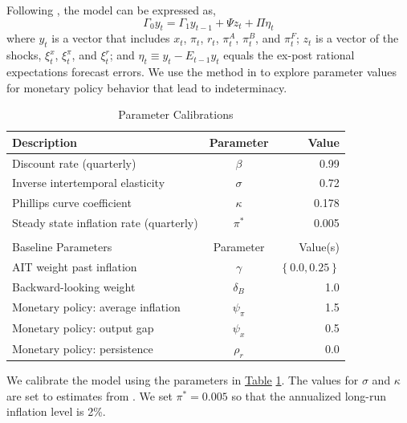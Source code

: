 \documentclass[english,authoryear,12pt]{elsarticle}
\begin{document}
Following \citet{sims2002}, the model can be expressed as,
\begin{equation}
	\Gamma_0 y_t = \Gamma_1 y_{t-1} + \Psi z_t + \Pi \eta_t
\end{equation}
where $y_t$ is a vector that includes $x_t$, $\pi_t$, $r_t$, $\pi_t^A$, $\pi_t^B$, and $\pi_t^F$; $z_t$ is a vector of the shocks, $\xi_t^x$, $\xi_t^\pi$, and $\xi_t^r$; and $\eta_t \equiv y_t - E_{t-1} y_t$ equals the ex-post rational expectations forecast errors. We use the method in \citet{sims2002} to explore parameter values for monetary policy behavior that lead to indeterminacy.

\begin{table}[htp]
	\captionsetup{justification=centering}
	\caption{Parameter Calibrations}\label{tb:parms}
	\begin{center}
		\vspace*{-1pc}\begin{tabular}{lcr}
			Description & Parameter & Value \\ \hline
			Discount rate (quarterly) & $\beta$ & 0.99 \\
			Inverse intertemporal elasticity & $\sigma$ & 0.72 \\
			Phillips curve coefficient & $\kappa$ & 0.178 \\
			Steady state inflation rate (quarterly) & $\pi^*$ & 0.005 \\ [0.25pc]
			\hline \\ [-0.25pc]
			Baseline Parameters & Parameter & Value(s) \\ \hline
			AIT weight past inflation & $\gamma$ & $\left\{ 0.0, 0.25 \right\}$ \\
			Backward-looking weight & $\delta_B$ & 1.0 \\
			Monetary policy: average inflation & $\psi_\pi$ & 1.5 \\
			Monetary policy: output gap & $\psi_x$ & 0.5 \\
			Monetary policy: persistence & $\rho_r$ & 0.0 \\ \hline
		\end{tabular}
	\end{center}
\end{table}

We calibrate the model using the parameters in \href{tb:parms}{Table} \ref{tb:parms}. The values for $\sigma$ and $\kappa$ are set to estimates from \citet{smetswouters2007}. We set $\pi^*=0.005$ so that the annualized long-run inflation level is 2\%.
\end{document}
